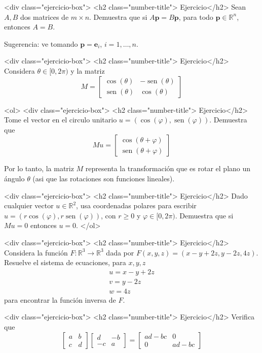 \documentclass{article}
\theoremstyle{definition}
\newcommand{\sen}{\operatorname{sen}}
\begin{document}
	<div class="ejercicio-box"> <h2 class="number-title"> Ejercicio</h2> Sean $A,B$ dos matrices de $m \times n$. Demuestra que si $A\mathbf{p}=B\mathbf{p}$,
	para todo $\mathbf{p}\in \mathbb{R}^n$, entonces $A=B$. 
	
	Sugerencia: ve tomando $\mathbf{p}=\mathbf{e}_i$, $i=1,\dots, n$.



        
<div class="ejercicio-box"> <h2 class="number-title"> Ejercicio</h2> Considera $\theta\in [0, 2\pi)$ y la matriz 
$$
M=\left[
\begin{array}{cc}
\cos(\theta ) & -\sen(\theta) \\
\sen(\theta) & \cos(\theta)
\end{array}
\right]
$$

<ol>
<div class="ejercicio-box"> <h2 class="number-title"> Ejercicio</h2> Tome el vector en el circulo unitario $u=(\cos(\varphi), \sen(\varphi))$. Demuestra que
$$
Mu=\left[
\begin{array}{c}
\cos(\theta+\varphi) \\
\sen(\theta+\varphi)
\end{array}
\right]
$$


Por lo tanto, la matriz $M$ representa la transformación que es rotar el plano un ángulo $\theta$
(asi que las rotaciones son funciones lineales).

<div class="ejercicio-box"> <h2 class="number-title"> Ejercicio</h2> Dado cualquier vector $u\in \mathbb{R}^2$, usa coordenadas polares para escribir $u=(r\cos(\varphi), r\sen(\varphi))$, con $r\geq 0$ y $\varphi\in [0,2\pi)$. Demuestra que si $Mu=0$ entonces $u=0$.
</ol>


	
	<div class="ejercicio-box"> <h2 class="number-title"> Ejercicio</h2> Considera la función $F:\mathbb{R}^3\to  \mathbb{R}^3$ dada por
	$F(x,y,z)=(x-y+2z, y-2z, 4z)$. Resuelve el sistema de ecuaciones, para $x,y,z$
	$$
	\begin{array}{c}
	u=x-y+2z \\
	v=y-2z\\
	w=4z
	\end{array}
	$$
	para encontrar la función inversa de $F$.


        <div class="ejercicio-box"> <h2 class="number-title"> Ejercicio</h2> Verifica que 
	$$
	\left[
	\begin{array}{cc}
	a & b \\
	c & d
	\end{array}
	\right] 
	\left[
	\begin{array}{cc}
	d & -b \\
	-c & a
	\end{array}
	\right]=
	\left[
	\begin{array}{cc}
	ad-bc & 0 \\
	0 & ad-bc 
	\end{array}
	\right]
	$$
\end{document}
